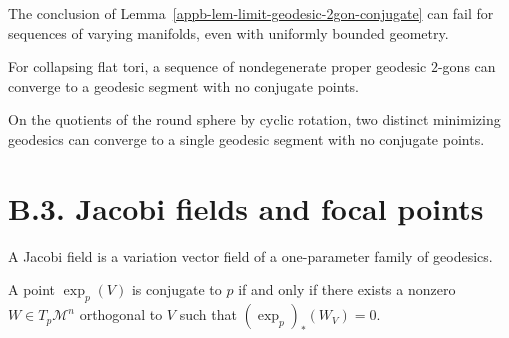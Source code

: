 \begin{remark}
\label{appb-rem-limit-failure-varying-manifolds}

The conclusion of Lemma~\ref{appb-lem-limit-geodesic-2gon-conjugate} can fail for sequences of varying manifolds, even with uniformly bounded geometry.
\end{remark}

\begin{example}
\label{appb-ex-collapsing-flat-tori}

For collapsing flat tori, a sequence of nondegenerate proper geodesic $2$-gons can converge to a geodesic segment with no conjugate points.
\end{example}

\begin{example}
\label{appb-ex-spherical-orbifold}

On the quotients of the round sphere by cyclic rotation, two distinct minimizing geodesics can converge to a single geodesic segment with no conjugate points.
\end{example}

\section*{B.3. Jacobi fields and focal points}

\begin{definition}
\label{appb-def-jacobi-field}



A Jacobi field is a variation vector field of a one-parameter family of geodesics.
\end{definition}

\begin{lemma}
\label{appb-lem-conjugate-differential-exp}


A point $\exp_p(V)$ is conjugate to $p$ if and only if there exists a nonzero $W\in T_p\mathcal M^n$ orthogonal to $V$ such that $(\exp_p)_*(W_V)=0$.
\end{lemma}


